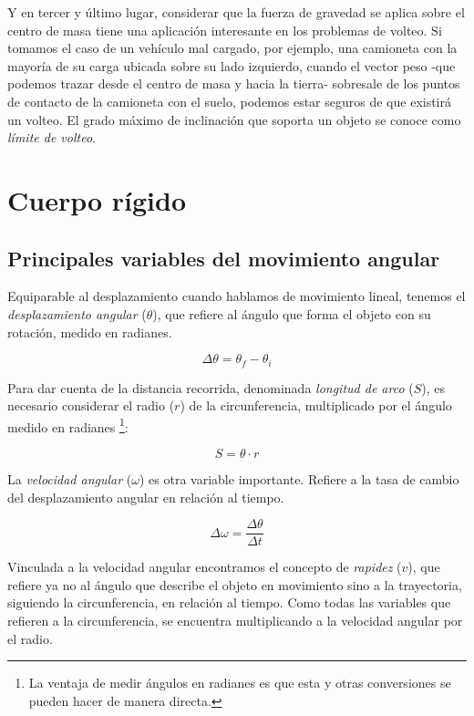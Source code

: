 \documentclass[12pt]{article}
\begin{document}
Y en tercer y último lugar,
considerar que la fuerza de gravedad se aplica sobre el centro de masa tiene una aplicación interesante en los problemas de volteo.
Si tomamos el caso de un vehículo mal cargado,
por ejemplo,
una camioneta con la mayoría de su carga ubicada sobre su lado izquierdo,
cuando el vector peso
-que podemos trazar desde el centro de masa y hacia la tierra-
sobresale de los puntos de contacto de la camioneta con el suelo,
podemos estar seguros de que existirá un volteo.
El grado máximo de inclinación que soporta un objeto se conoce como \textit{límite de volteo}.

\pagebreak

\section{Cuerpo rígido}

\subsection{Principales variables del movimiento angular}

Equiparable al desplazamiento cuando hablamos de movimiento lineal,
tenemos el \textit{desplazamiento angular} (\(\theta\)),
que refiere al ángulo que forma el objeto con su rotación,
medido en radianes.

\begin{equation}
	\Delta\theta = \theta_{f} - \theta_{i}
\end{equation}

Para dar cuenta de la distancia recorrida,
denominada \textit{longitud de arco} (\(S\)),
es necesario considerar el radio (\(r\)) de la circunferencia,
multiplicado por el ángulo medido en radianes
\footnote{La ventaja de medir ángulos en radianes es que esta y otras conversiones se pueden hacer de manera directa.}:

\begin{equation}
	S = \theta\cdot r
\end{equation}

La \textit{velocidad angular} (\(\omega\)) es otra variable importante.
Refiere a la tasa de cambio del desplazamiento angular en relación al tiempo.

\begin{equation}
	\Delta\omega = \frac{\Delta\theta}{\Delta t}
\end{equation}

Vinculada a la velocidad angular encontramos el concepto de \textit{rapidez} (\(v\)),
que refiere ya no al ángulo que describe el objeto en movimiento sino a la trayectoria,
siguiendo la circunferencia,
en relación al tiempo.
Como todas las variables que refieren a la circunferencia,
se encuentra multiplicando a la velocidad angular por el radio.
\end{document}
